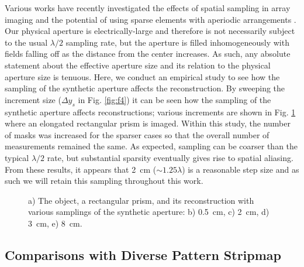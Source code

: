\documentclass[journal]{IEEEtran}
\begin{document}
Various works have recently investigated the effects of spatial sampling in array imaging and the potential of using sparse elements with aperiodic arrangements \cite{gonzalez2014sparse,yurduseven2016Aperiodic}. Our physical aperture is electrically-large and therefore is not necessarily subject to the usual $\lambda/2$ sampling rate, but the aperture is filled inhomogeneously with fields falling off as the distance from the center increases. As such, any absolute statement about the effective aperture size and its relation to the physical aperture size is tenuous. Here, we conduct an empirical study to see how the sampling of the synthetic aperture affects the reconstruction. By sweeping the increment size ($\Delta y_s$ in Fig. \ref{fig:f4}) it can be seen how the sampling of the synthetic aperture affects reconstructions; various increments are shown in Fig. \ref{fig:f7} where an elongated rectangular prism is imaged. Within this study, the number of masks was increased for the sparser cases so that the overall number of measurements remained the same. As expected, sampling can be coarser than the typical $\lambda/2$ rate, but substantial sparsity eventually gives rise to spatial aliasing. From these results, it appears that \SI{2}{\centi\meter} (${\sim}1.25\lambda$) is a reasonable step size and as such we will retain this sampling throughout this work. 

\begin{figure}
	\centering
	\caption{\label{fig:f7}a) The object, a rectangular prism, and its reconstruction with various samplings of the synthetic aperture: b) \SI{0.5}{\centi\meter}, c) \SI{2}{\centi\meter}, d) \SI{3}{\centi\meter}, e) \SI{8}{\centi\meter}.}
\end{figure}

\subsection{Comparisons with Diverse Pattern Stripmap}
\label{ssec:ssecC}
\end{document}
